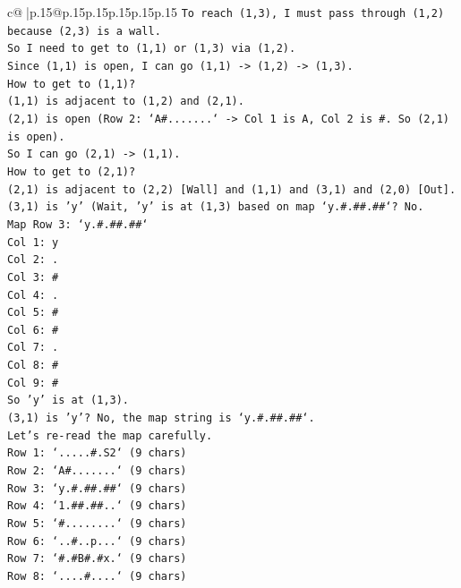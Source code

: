 \documentclass{article}
\begin{document}
{\begin{supertabular}{c@{$\;$}|p{.15\linewidth}@{}p{.15\linewidth}p{.15\linewidth}p{.15\linewidth}p{.15\linewidth}p{.15\linewidth}}
{{{\texttt{To reach (1,3), I must pass through (1,2) because (2,3) is a wall.} \\
\texttt{So I need to get to (1,1) or (1,3) via (1,2).} \\
\texttt{Since (1,1) is open, I can go (1,1) {-}> (1,2) {-}> (1,3).} \\
\texttt{How to get to (1,1)?} \\
\texttt{(1,1) is adjacent to (1,2) and (2,1).} \\
\texttt{(2,1) is open (Row 2: `A\#.......` {-}> Col 1 is A, Col 2 is \#. So (2,1) is open).} \\
\texttt{So I can go (2,1) {-}> (1,1).} \\
\texttt{How to get to (2,1)?} \\
\texttt{(2,1) is adjacent to (2,2) {[}Wall{]} and (1,1) and (3,1) and (2,0) {[}Out{]}.} \\
\texttt{(3,1) is 'y' (Wait, 'y' is at (1,3) based on map `y.\#.\#\#.\#\#`? No.} \\
\texttt{Map Row 3: `y.\#.\#\#.\#\#`} \\
\texttt{Col 1: y} \\
\texttt{Col 2: .} \\
\texttt{Col 3: \#} \\
\texttt{Col 4: .} \\
\texttt{Col 5: \#} \\
\texttt{Col 6: \#} \\
\texttt{Col 7: .} \\
\texttt{Col 8: \#} \\
\texttt{Col 9: \#} \\
\texttt{So 'y' is at (1,3).} \\
\texttt{(3,1) is 'y'? No, the map string is `y.\#.\#\#.\#\#`.} \\
\texttt{Let's re{-}read the map carefully.} \\
\texttt{Row 1: `.....\#.S2` (9 chars)} \\
\texttt{Row 2: `A\#.......` (9 chars)} \\
\texttt{Row 3: `y.\#.\#\#.\#\#` (9 chars)} \\
\texttt{Row 4: `1.\#\#.\#\#..` (9 chars)} \\
\texttt{Row 5: `\#........` (9 chars)} \\
\texttt{Row 6: `..\#..p...` (9 chars)} \\
\texttt{Row 7: `\#.\#B\#.\#x.` (9 chars)} \\
\texttt{Row 8: `....\#....` (9 chars)} \\
}}}
\end{supertabular}}
\end{document}
